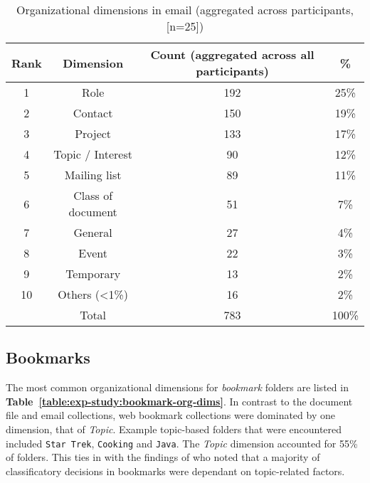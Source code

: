 \begin{table}[btp]
\begin{center}
\begin{footnotesize}
\setlength{\extrarowheight}{2pt}
\begin{tabular}{|c|c|c|c|}
\hline
{\bf Rank} & {\bf Dimension} & {\bf Count (aggregated across all participants)} &   {\bf \%} \\
\hline
         1 &       Role &        192 &       25\% \\
\hline
         2 &    Contact &        150 &       19\% \\
\hline
         3 &    Project &        133 &       17\% \\
\hline
         4 & Topic / Interest &         90 &       12\% \\
\hline
         5 & Mailing list &         89 &       11\% \\
\hline
         6 & Class of document &         51 &        7\% \\
\hline
         7 &    General &         27 &        4\% \\
\hline
         8 &      Event &         22 &        3\% \\
\hline
         9 &  Temporary &         13 &        2\% \\
\hline
        10 & Others (<1\%) &         16 &        2\% \\
\hline
           &      Total &        783 &      100\% \\
\hline
\end{tabular}  
\end{footnotesize}
\caption{Organizational dimensions in email (aggregated across participants, [n=25])}
\label{table:exp-study:email-org-dims}
\end{center}
\end{table}

\subsection{Bookmarks}

The most common organizational dimensions for \textit{bookmark} folders are listed in \textbf{Table~\ref{table:exp-study:bookmark-org-dims}}.
In contrast to the document file and email collections, web bookmark collections were dominated by one dimension, that of \textit{Topic}. Example topic-based folders that were encountered included \texttt{Star Trek}, \texttt{Cooking} and \texttt{Java}.
The \textit{Topic} dimension accounted for 55\% of folders. This ties in with the findings of \citet{gd:01} who noted that a majority of classificatory decisions in bookmarks were dependant on topic-related factors.

